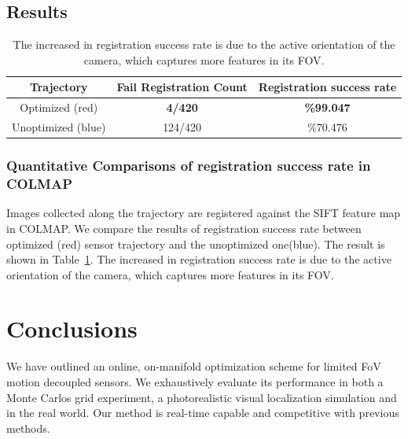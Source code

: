 \documentclass[letterpaper, 10 pt, conference]{ieeeconf}  %
\begin{document}
\subsection{Results}
\begin{table}
    \centering

    \begin{tabular}{|c|c|c|}
        \hline
        Trajectory & Fail Registration  Count & Registration success rate\\
            \hline
        Optimized (red) & \textbf{4/420} & \textbf{\%99.047} \\
        Unoptimized (blue) &  124/420 &\%70.476 \\
            \hline
    \end{tabular}
    \caption{The increased in registration success rate is due to the active orientation of the camera, which captures more features in its FOV.}
    \label{tab:my_label}
\end{table}
\subsubsection{Quantitative Comparisons of registration success rate in COLMAP}
Images collected along the trajectory are registered against the SIFT feature map in COLMAP. We compare the results of registration success rate between optimized (red) sensor trajectory and the unoptimized one(blue). The result is shown in Table~\ref{tab:my_label}. The increased in registration success rate is due to the active orientation of the camera, which captures more features in its FOV.




\section{Conclusions}
We have outlined an online, on-manifold optimization scheme for limited FoV motion decoupled sensors. We exhaustively evaluate its performance in both a Monte Carlos grid experiment, a photorealistic visual localization simulation and in the real world. Our method is real-time capable and competitive with previous methods.
\end{document}

